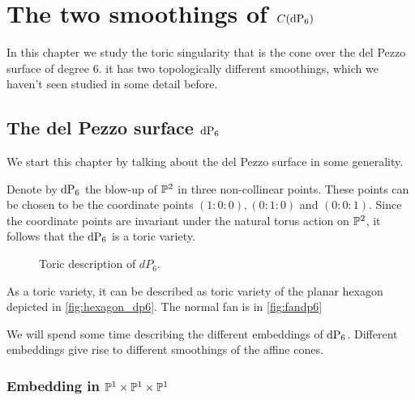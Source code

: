 \chapter{The two smoothings of \texorpdfstring{$C(\dP6)$}{C(dP6)}}
\label{chap:smoothings}

In this chapter we study the toric singularity that is the cone over the del Pezzo surface of degree $6$. it has two topologically different smoothings, which we haven't seen studied in some detail before. 

\section{The del Pezzo surface \texorpdfstring{$\dP6$}{dP6}}
\label{sec:twosmoothings}

We start this chapter by talking about the del Pezzo surface in some generality. 

Denote by $\dP6$ the blow-up of $\P^2$ in three non-collinear points.  These points can be chosen to be the coordinate points $(1:0:0),(0:1:0)$ and $(0:0:1)$. Since the coordinate points are invariant under the natural torus action on $\P^2$, it follows that the $\dP6$ is a toric variety.

\begin{figure}[b]
\centering 
\hspace*{\fill}%
\hspace*{\fill}%
\hspace*{\fill}%
\caption{Toric description of $dP_6$.}
\end{figure}

As a toric variety, it can be described as toric variety of the planar hexagon depicted in \cref{fig:hexagon_dp6}. The normal fan is in \cref{fig:fandp6}

We will spend some time describing the different embeddings of $\dP6$. Different embeddings give rise to different smoothings of the affine cones.

\subsection{Embedding in $\P^1 \times \P^1 \times \P^1$}

